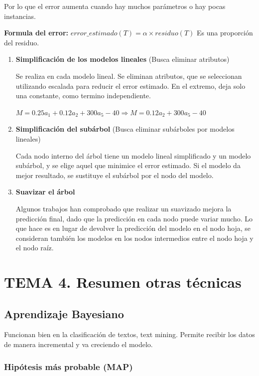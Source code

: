 \documentclass[12pt]{report} %
\begin{document}
Por lo que el error aumenta cuando hay muchos parámetros o hay pocas
instancias.

\textbf{Formula del error:}
\(error\_estimado(T) = \alpha \times residuo(T)\) Es una proporción del
residuo.

\begin{enumerate}
\def\labelenumi{\arabic{enumi}.}
\item
  \textbf{Simplificación de los modelos lineales} (Busca eliminar
  atributos)

  Se realiza en cada modelo lineal. Se eliminan atributos, que se
  seleccionan utilizando escalada para reducir el error estimado. En el
  extremo, deja solo una constante, como termino independiente.

  \(M= 0.25a_1+0.12a_2+300a_5-40 \Rightarrow M=0.12a_2+300a_5-40\)
\item
\textbf{Simplificación del subárbol} (Busca eliminar subárboles por modelos
  lineales)

  Cada nodo interno del árbol tiene un modelo lineal simplificado y un
  modelo subárbol, y se elige aquel que minimice el error estimado. Si
  el modelo da mejor resultado, se sustituye el subárbol por el nodo del
  modelo.
\item
  \textbf{Suavizar el árbol}

  Algunos trabajos han comprobado que realizar un suavizado mejora la
  predicción final, dado que la predicción en cada nodo puede variar
  mucho. Lo que hace es en lugar de devolver la predicción del modelo en
  el nodo hoja, se consideran también los modelos en los nodos
  intermedios entre el nodo hoja y el nodo raíz.
\end{enumerate}

\chapter{TEMA 4. Resumen otras técnicas}

\section{Aprendizaje Bayesiano}

Funcionan bien en la clasificación de textos, text mining. Permite
recibir los datos de manera incremental y va creciendo el modelo.

\subsection{Hipótesis más probable
(MAP)}
\end{document}
